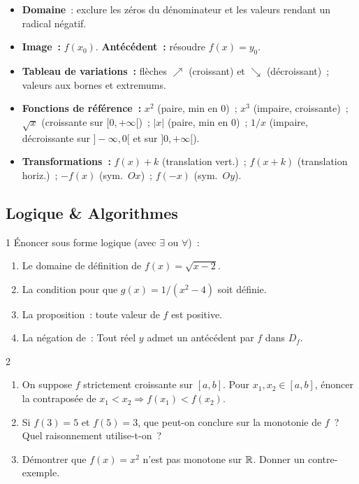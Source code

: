 \begin{bilan}
\begin{itemize}
  \item \textbf{Domaine}~: exclure les z\'eros du d\'enominateur
        et les valeurs rendant un radical n\'egatif.
  \item \textbf{Image~:} $f(x_0)$. \textbf{Ant\'ec\'edent~:} r\'esoudre $f(x)=y_0$.
  \item \textbf{Tableau de variations~:} fl\`eches $\nearrow$ (croissant)
        et $\searrow$ (d\'ecroissant)~; valeurs aux bornes et extremums.
  \item \textbf{Fonctions de r\'ef\'erence~:}
        $x^2$ (paire, min en 0)~; $x^3$ (impaire, croissante)~;
        $\sqrt{x}$ (croissante sur $[0,+\infty[$)~;
        $|x|$ (paire, min en 0)~; $1/x$ (impaire, d\'ecroissante sur $]-\infty,0[$ et sur $]0,+\infty[$).
  \item \textbf{Transformations~:} $f(x)+k$ (translation vert.)~;
        $f(x+k)$ (translation horiz.)~; $-f(x)$ (sym.\ $Ox$)~;
        $f(-x)$ (sym.\ $Oy$).
\end{itemize}

\subsection*{Logique \& Algorithmes}

\begin{exo}{1}
\'Enoncer sous forme logique (avec $\exists$ ou $\forall$)~:
\begin{enumerate}
  \item Le domaine de d\'efinition de $f(x)=\sqrt{x-2}$.
  \item La condition pour que $g(x)=1/(x^2-4)$ soit d\'efinie.
  \item La proposition~: \og toute valeur de $f$ est positive\fg.
  \item La n\'egation de~: \og Tout r\'eel $y$ admet un ant\'ec\'edent par $f$ dans $D_f$\fg.
\end{enumerate}
\end{exo}

\begin{exo}{2}
\begin{enumerate}
  \item On suppose $f$ strictement croissante sur $[a,b]$.
        Pour $x_1,x_2\in[a,b]$, \'enoncer la contrapos\'ee de
        $x_1<x_2\Rightarrow f(x_1)<f(x_2)$.
  \item Si $f(3)=5$ et $f(5)=3$, que peut-on conclure sur la monotonie de $f$~?
        Quel raisonnement utilise-t-on~?
  \item D\'emontrer que $f(x)=x^2$ n'est pas monotone sur $\mathbb{R}$.
        Donner un contre-exemple.
\end{enumerate}
\end{exo}


\end{bilan}
